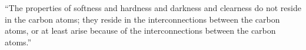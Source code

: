 “The properties of softness and hardness and darkness and clearness do not reside in the carbon atoms; they reside in the interconnections between the carbon atoms, or at least arise because of the interconnections between the carbon atoms.” 